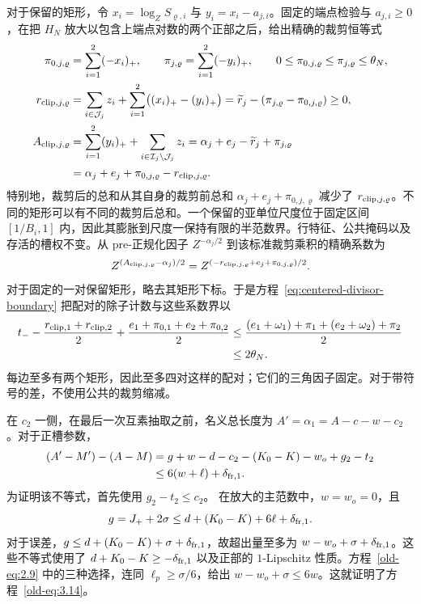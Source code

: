 \documentclass[11pt,a4paper]{article}
\numberwithin{equation}{section}
\numberwithin{figure}{section}
\theoremstyle{definition}
\theoremstyle{remark}
\begin{document}
对于保留的矩形，令 \(x_i=\log_ZS_{\varrho,i}\) 与 \(y_i=x_i-a_{j,i}\)。固定的端点检验与 \(a_{j,i}\ge0\)，在把 \(H_N\) 放大以包含上端点对数的两个正部之后，给出精确的裁剪恒等式
\begin{equation}
 \begin{aligned}
 \pi_{0,j,\varrho}&=\sum_{i=1}^2(-x_i)_+,\qquad
 \pi_{j,\varrho}=\sum_{i=1}^2(-y_i)_+,
 \qquad 0\le\pi_{0,j,\varrho}\le\pi_{j,\varrho}\le\theta_N,\\
 r_{{\rm clip},j,\varrho}
 &=\sum_{i\in\mathcal J_j}z_i+
       \sum_{i=1}^2\bigl((x_i)_+-(y_i)_+\bigr)
 =\widetilde r_j-(\pi_{j,\varrho}-\pi_{0,j,\varrho})\ge0,\\
 A_{{\rm clip},j,\varrho}
 &=\sum_{i=1}^2(y_i)_++\sum_{i\in\mathcal I_j\setminus\mathcal J_j}z_i
 =\alpha_j+e_j-\widetilde r_j+\pi_{j,\varrho}\\
 &=\alpha_j+e_j+\pi_{0,j,\varrho}-r_{{\rm clip},j,\varrho}.
 \end{aligned}
 \label{eq:centered-clipped-rectangle}
\end{equation}
特别地，裁剪后的总和从其自身的裁剪前总和 \(\alpha_j+e_j+\pi_{0,j,\varrho}\) 减少了 \(r_{{\rm clip},j,\varrho}\)。不同的矩形可以有不同的裁剪后总和。一个保留的亚单位尺度位于固定区间 \([1/B_i,1]\) 内，因此其膨胀到尺度一保持有限的半范数界。行特征、公共掩码以及存活的槽权不变。从 pre-正规化因子 \(Z^{-\alpha_j/2}\) 到该标准裁剪乘积的精确系数为
\[
 Z^{(A_{{\rm clip},j,\varrho}-\alpha_j)/2}
 =Z^{(-r_{{\rm clip},j,\varrho}+e_j+\pi_{0,j,\varrho})/2}.
\]
对于固定的一对保留矩形，略去其矩形下标。于是方程~\eqref{eq:centered-divisor-boundary} 把配对的除子计数与这些系数界以
\begin{equation}
 \begin{split}
 t_- -\frac{r_{{\rm clip},1}+r_{{\rm clip},2}}2
     +\frac{e_1+\pi_{0,1}+e_2+\pi_{0,2}}2
 &\le\frac{(e_1+\omega_1)+\pi_1+(e_2+\omega_2)+\pi_2}{2}\\
 &\le2\theta_N.
 \end{split}
 \label{eq:centered-clipped-shell}
\end{equation}
每边至多有两个矩形，因此至多四对这样的配对；它们的三角因子固定。对于带符号的差，不使用公共的裁剪缩减。

在 \(c_2\) 一侧，在最后一次互素抽取之前，名义总长度为 \(A'=\alpha_1=A-c-w-c_2\)。对于正槽参数，
\begin{equation}
 \begin{split}
 (A'-M')-(A-M)
 &=g+w-d-c_2-(K_0-K)-w_o+g_2-t_2\\
 &\le6(w+\ell)+\delta_{{\rm fr},1}.
 \end{split}
 \label{old-eq:3.14}
\end{equation}
为证明该不等式，首先使用 \(g_2-t_2\le c_2\)。
在放大的主范数中，\(w=w_o=0\)，且
\[
 g=J_++2\sigma
 \le d+(K_0-K)+6\ell+\delta_{{\rm fr},1}.
\]
对于误差，\(g\le d+(K_0-K)+\sigma+\delta_{{\rm fr},1}\)，故超出量至多为 \(w-w_o+\sigma+\delta_{{\rm fr},1}\)。这些不等式使用了 \(d+K_0-K\ge-\delta_{{\rm fr},1}\) 以及正部的 \(1\)-Lipschitz 性质。方程~\eqref{old-eq:2.9} 中的三种选择，连同 \(\ell_p\ge\sigma/6\)，给出 \(w-w_o+\sigma\le6w\)。这就证明了方程~\eqref{old-eq:3.14}。
\end{document}
